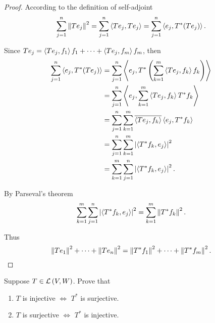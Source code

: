 \begin{proof}
    According to the definition of self-adjoint
    \[
        \sum^{n}_{j=1}\left\Vert{Te_{j}}\right\Vert^{2} = \sum^{n}_{j=1}\left\langle{Te_{j}, Te_{j}}\right\rangle = \sum^{n}_{j=1}\left\langle{e_{j}, T^{*}(Te_{j})}\right\rangle.
    \]

    Since $Te_{j} = \left\langle{Te_{j}, f_{1}}\right\rangle f_{1} + \cdots + \left\langle{Te_{j}, f_{m}}\right\rangle f_{m}$, then
    \begin{align*}
        \sum^{n}_{j=1}\left\langle{e_{j}, T^{*}(Te_{j})}\right\rangle & = \sum^{n}_{j=1}\left\langle{e_{j}, T^{*}\left( \sum^{m}_{k=1}\left\langle{Te_{j}, f_{k}}\right\rangle f_{k} \right)}\right\rangle \\
                                                       & = \sum^{n}_{j=1}\left\langle{e_{j}, \sum^{m}_{k=1}\left\langle{Te_{j}, f_{k}}\right\rangle T^{*}f_{k}}\right\rangle               \\
                                                       & = \sum^{n}_{j=1}\sum^{m}_{k=1}\overline{\left\langle{Te_{j}, f_{k}}\right\rangle}\left\langle{e_{j}, T^{*}f_{k}}\right\rangle         \\
                                                       & =  \sum^{n}_{j=1}\sum^{m}_{k=1}\left\vert{\left\langle{T^{*}f_{k}, e_{j}}\right\rangle}\right\vert^{2}                              \\
                                                       & = \sum^{m}_{k=1}\sum^{n}_{j=1}\left\vert{\left\langle{T^{*}f_{k}, e_{j}}\right\rangle}\right\vert^{2}.
    \end{align*}

    By Parseval's theorem
    \[
        \sum^{m}_{k=1}\sum^{n}_{j=1}\left\vert{\left\langle{T^{*}f_{k}, e_{j}}\right\rangle}\right\vert^{2} =  \sum^{m}_{k=1}\left\Vert{T^{*}f_{k}}\right\Vert^{2}.
    \]

    Thus
    \[
        \left\Vert{Te_{1}}\right\Vert^{2} + \cdots + \left\Vert{Te_{n}}\right\Vert^{2} = \left\Vert{T^{*}f_{1}}\right\Vert^{2} + \cdots + \left\Vert{T^{*}f_{m}}\right\Vert^{2}.
    \]
\end{proof}
\newpage

\begin{exercise}
    Suppose $T\in\mathcal{L}\left({V, W}\right)$. Prove that
    \begin{enumerate}[label={(\alph*)}]
        \item $T$ is injective $\Longleftrightarrow$ $T^{*}$ is surjective.
        \item $T$ is surjective $\Longleftrightarrow$ $T^{*}$ is injective.
    \end{enumerate}
\end{exercise}

